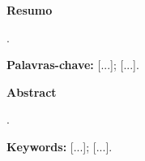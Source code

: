 \thispagestyle{empty}


\begin{center}
    {\LARGE \textbf{Resumo}}
\end{center}

\vspace{1.0 cm}

\noindent [...].

\vspace{0.5 cm}

\noindent \textbf{Palavras-chave:} [...]; [...].

\newpage

\thispagestyle{empty}


\begin{center}
    {\LARGE \textbf{Abstract}}
\end{center}

\vspace{1.0 cm}

\noindent [...].

\vspace{0.5 cm}

\noindent \textbf{Keywords:} [...]; [...].

\newpage